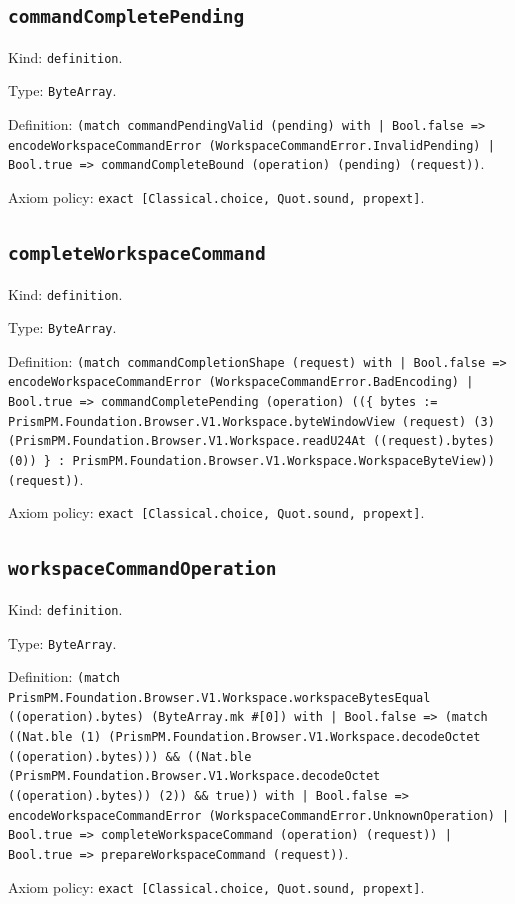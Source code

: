 \documentclass[11pt]{article}
\begin{document}
\subsection*{\texttt{commandCompletePending}}
\noindent Kind: \texttt{definition}.\par
\noindent Type: \texttt{ByteArray}.\par
\noindent Definition: \texttt{(match commandPendingValid (pending) with | Bool.false => encodeWorkspaceCommandError (WorkspaceCommandError.InvalidPending) | Bool.true => commandCompleteBound (operation) (pending) (request))}.\par
\noindent Axiom policy: \texttt{exact [Classical.choice, Quot.sound, propext]}.\par
\subsection*{\texttt{completeWorkspaceCommand}}
\noindent Kind: \texttt{definition}.\par
\noindent Type: \texttt{ByteArray}.\par
\noindent Definition: \texttt{(match commandCompletionShape (request) with | Bool.false => encodeWorkspaceCommandError (WorkspaceCommandError.BadEncoding) | Bool.true => commandCompletePending (operation) ((\{ bytes := PrismPM.Foundation.Browser.V1.Workspace.byteWindowView (request) (3) (PrismPM.Foundation.Browser.V1.Workspace.readU24At ((request).bytes) (0)) \} : PrismPM.Foundation.Browser.V1.Workspace.WorkspaceByteView)) (request))}.\par
\noindent Axiom policy: \texttt{exact [Classical.choice, Quot.sound, propext]}.\par
\subsection*{\texttt{workspaceCommandOperation}}
\noindent Kind: \texttt{definition}.\par
\noindent Type: \texttt{ByteArray}.\par
\noindent Definition: \texttt{(match PrismPM.Foundation.Browser.V1.Workspace.workspaceBytesEqual ((operation).bytes) (ByteArray.mk \#[0]) with | Bool.false => (match ((Nat.ble (1) (PrismPM.Foundation.Browser.V1.Workspace.decodeOctet ((operation).bytes))) \&\& ((Nat.ble (PrismPM.Foundation.Browser.V1.Workspace.decodeOctet ((operation).bytes)) (2)) \&\& true)) with | Bool.false => encodeWorkspaceCommandError (WorkspaceCommandError.UnknownOperation) | Bool.true => completeWorkspaceCommand (operation) (request)) | Bool.true => prepareWorkspaceCommand (request))}.\par
\noindent Axiom policy: \texttt{exact [Classical.choice, Quot.sound, propext]}.\par
\end{document}
